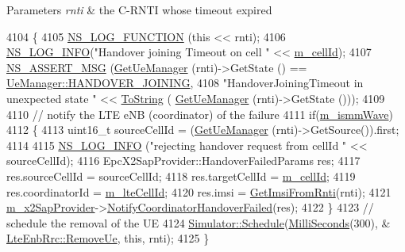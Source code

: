 \begin{DoxyParams}{Parameters}
{\em rnti} & the C-\/\+R\+N\+TI whose timeout expired \\
\hline
\end{DoxyParams}

\begin{DoxyCode}
4104 \{
4105   \hyperlink{log-macros-disabled_8h_a90b90d5bad1f39cb1b64923ea94c0761}{NS\_LOG\_FUNCTION} (\textcolor{keyword}{this} << rnti);
4106   \hyperlink{group__logging_gafbd73ee2cf9f26b319f49086d8e860fb}{NS\_LOG\_INFO}(\textcolor{stringliteral}{"Handover joining Timeout on cell "} << \hyperlink{classns3_1_1LteEnbRrc_a4ced331e168e6c1aeca0bb11be19b8c7}{m\_cellId});
4107   \hyperlink{assert_8h_aff5ece9066c74e681e74999856f08539}{NS\_ASSERT\_MSG} (\hyperlink{classns3_1_1LteEnbRrc_a875653948b565dc50b33f6a0434e32d9}{GetUeManager} (rnti)->GetState () == 
      \hyperlink{classns3_1_1UeManager_a2f4085fdd18d7125c27da44a5b8b6808a093669f7255c35aa11645ba004a896ea}{UeManager::HANDOVER\_JOINING},
4108                  \textcolor{stringliteral}{"HandoverJoiningTimeout in unexpected state "} << \hyperlink{namespacens3_a3d1f7e1bec1972e2ae8d64673fcfcd9c}{ToString} (
      \hyperlink{classns3_1_1LteEnbRrc_a875653948b565dc50b33f6a0434e32d9}{GetUeManager} (rnti)->GetState ()));
4109   
4110   \textcolor{comment}{// notify the LTE eNB (coordinator) of the failure}
4111   \textcolor{keywordflow}{if}(\hyperlink{classns3_1_1LteEnbRrc_a44515fc06d16f2b477afe0c05425e206}{m\_ismmWave})
4112   \{
4113     uint16\_t sourceCellId = (\hyperlink{classns3_1_1LteEnbRrc_a875653948b565dc50b33f6a0434e32d9}{GetUeManager} (rnti)->GetSource()).first;
4114 
4115     \hyperlink{group__logging_gafbd73ee2cf9f26b319f49086d8e860fb}{NS\_LOG\_INFO} (\textcolor{stringliteral}{"rejecting handover request from cellId "} << sourceCellId);
4116     EpcX2SapProvider::HandoverFailedParams res;
4117     res.sourceCellId = sourceCellId;
4118     res.targetCellId = \hyperlink{classns3_1_1LteEnbRrc_a4ced331e168e6c1aeca0bb11be19b8c7}{m\_cellId};
4119     res.coordinatorId = \hyperlink{classns3_1_1LteEnbRrc_a23c61a4208f98c30a566e685ac932781}{m\_lteCellId};
4120     res.imsi = \hyperlink{classns3_1_1LteEnbRrc_a1a1a3c1703bd1d39d4fcd0657788d1bd}{GetImsiFromRnti}(rnti);
4121     \hyperlink{classns3_1_1LteEnbRrc_ae8dc75f4f6f63b7736d86204a4beb415}{m\_x2SapProvider}->\hyperlink{classns3_1_1EpcX2SapProvider_a602a5b409a43c5a707cb5ce098d22ff3}{NotifyCoordinatorHandoverFailed}(res);
4122   \}
4123   \textcolor{comment}{// schedule the removal of the UE}
4124   \hyperlink{classns3_1_1Simulator_a671882c894a08af4a5e91181bf1eec13}{Simulator::Schedule}(\hyperlink{group__timecivil_gaf26127cf4571146b83a92ee18679c7a9}{MilliSeconds}(300), &
      \hyperlink{classns3_1_1LteEnbRrc_a0e507111feeaf6e7f34555b6141525f7}{LteEnbRrc::RemoveUe}, \textcolor{keyword}{this}, rnti);
4125 \}
\end{DoxyCode}


